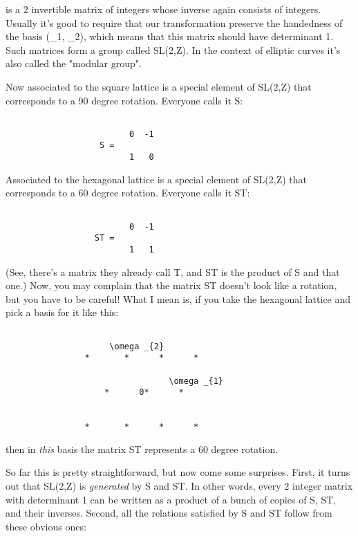 is a 2 invertible matrix of integers whose inverse again consists of
integers.  Usually it's good to require
that our transformation preserve the handedness of the basis (\omega _{1},
\omega _{2}), which means that this matrix should have determinant 1.
Such matrices form a group called SL(2,Z).  In the context of elliptic
curves it's also called the "modular group".

Now associated to the square lattice is a special element of SL(2,Z)
that corresponds to a 90 degree rotation.   Everyone calls it S:


\begin{verbatim}

                         0  -1
                   S =
                         1   0
\end{verbatim}
    
Associated to the hexagonal lattice is a special element of SL(2,Z) 
that corresponds to a 60 degree rotation.   Everyone calls it ST:


\begin{verbatim}

                         0  -1
                  ST =
                         1   1
\end{verbatim}
    
(See, there's a matrix they already call T, and ST is the product of S
and that one.)  Now, you may complain that the matrix ST doesn't look
like a rotation, but you have to be careful!   What I mean is, if you
take the hexagonal lattice and pick a basis for it like this:


\begin{verbatim}

                     \omega _{2}      
                *       *      *      *

                                 \omega _{1}
                    *      0*      *                


                *       *      *      *

\end{verbatim}
    
then in \emph{this} basis the matrix ST represents a 60 degree rotation.

So far this is pretty straightforward, but now come some surprises. 
First, it turns out that SL(2,Z) is \emph{generated} by S and ST.  In other
words, every 2 integer matrix with determinant 1 can be written as a
product of a bunch of copies of S, ST, and their inverses.  Second, all
the relations satisfied by S and ST follow from these obvious ones:

